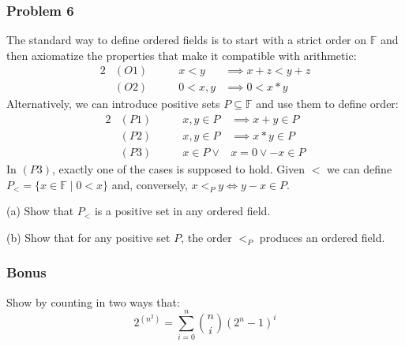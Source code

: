 \newpage\documentclass[11pt,onecolumn,fleqn]{article}
\theoremstyle{definition}
\begin{document}
\subsubsection*{Problem 6}
The standard way to define ordered fields 
is to start with a strict order on $\mathbb{F}$ and then axiomatize the properties that 
make it compatible with arithmetic:
%
\begin{alignat*}{2}
       &(O1)   \qquad &     x < y  &\implies  x + z < y + z  \\[1ex]
       &(O2)   \qquad &     0 < x,y  &\implies  0 < x*y  
\end{alignat*}
%
Alternatively, we can introduce  positive sets $P \subseteq \mathbb{F}$ and use
them to define order:
%
\begin{alignat*}{2}
       &(P1)   \qquad &     x, y \in P  &\implies  x + y \in P  \\[1ex]
       &(P2)   \qquad &     x, y \in P  &\implies  x * y \in P  \\[1ex]
       &(P3)   \qquad &     x \in P \lor \phantom{ }&x = 0 \lor -x \in P 
\end{alignat*}
%
In $(P3)$, exactly one of the cases is supposed to hold. 
Given $<$ we can define $P_{<} = \{ x \in \mathbb{F} \mid  0 < x\}$ and, conversely, 
$x <_{P} y \Longleftrightarrow y-x \in P$.
\vspace{2ex} 

(a)  Show that $P_{<}$ is a positive set in any ordered field.

(b)  Show that for any positive set $P$, the order $<_{P}$ produces an ordered field.




\subsubsection*{Bonus}
Show by counting in two ways that: 
$$2^{(n^2)} = \sum_{i = 0}^n {n \choose i}(2^n - 1)^{i}$$
\end{document}
